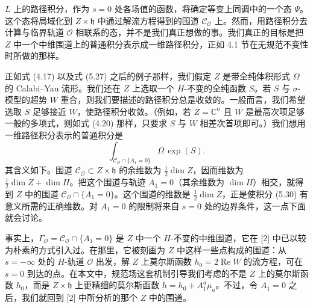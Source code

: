 \documentclass[11pt,a4paper,UTF8]{ctexart}
\theoremstyle{plain}
\theoremstyle{definition}
\begin{document}

$L$ 上的路径积分，作为 $s=0$ 处各场值的函数，将确定等变上同调中的一个态 $\Psi$。这个态将局域化到 $Z\times\mathfrak h$ 中通过解流方程得到的围道 $\mathcal C_{\mathcal O}$ 上。然而，用路径积分去计算与临界轨道 $\mathcal O$ 相联系的态，并不是我们真正想做的事。我们真正的目标是把 $Z$ 中一个中维围道上的普通积分表示成一维路径积分，正如 4.1 节在无规范不变性时所做的那样。

正如式 (4.17) 以及式 (5.27) 之后的例子那样，我们假定 $Z$ 是带全纯体积形式 $\Omega$ 的 Calabi–Yau 流形。我们还在 $Z$ 上选取一个 $H$-不变的全纯函数 $S$。若 $S$ 与 $\sigma$-模型的超势 $W$ 重合，则我们要描述的路径积分总是收敛的。一般而言，我们希望选取 $S$ 足够接近 $W$，使路径积分收敛。（例如，若 $Z=\mathbb C^n$ 且 $W$ 是最高次项足够一般的多项式，则如式 (4.20) 那样，只要求 $S$ 与 $W$ 相差次首项即可。）我们想用一维路径积分表示的普通积分是
\begin{equation}
    \int_{\mathcal C_{\mathcal O}\cap\{A_1=0\}}\Omega\,\exp(S).
    \tag{5.30}
\end{equation}
其含义如下。围道 $\mathcal C_{\mathcal O}\subset Z\times\mathfrak h$ 的余维数为 $\frac12\dim Z$，因而维数为 $\frac12\dim Z+\dim H$。把这个围道与轨迹 $A_1=0$（其余维数为 $\dim H$）相交，就得到 $Z$ 中的围道 $\mathcal C_{\mathcal O}\cap\{A_1=0\}$。这个围道的维数是 $\frac12\dim Z$，正是使积分 (5.30) 有意义所需的正确维数。对 $A_1=0$ 的限制将来自 $s=0$ 处的边界条件，这一点下面就会讨论。


事实上，$\Gamma_{\mathcal O}=\mathcal C_{\mathcal O}\cap\{A_1=0\}$ 是 $Z$ 中一个 $H$-不变的中维围道，它在 [2] 中已以较为朴素的方式引入过。在那里，它被刻画为 $Z$ 中这样一些点构成的围道：从 $s=-\infty$ 处的 $H$-轨道 $\mathcal O$ 出发，解 $Z$ 上莫尔斯函数 $h_0=2\operatorname{Re}W$ 的流方程，可在 $s=0$ 到达的点。在本文中，规范场这套机制引导我们考虑的不是 $Z$ 上的莫尔斯函数 $h_0$，而是 $Z\times\mathfrak h$ 上更精细的莫尔斯函数 $h=h_0+A_1^a\mu_a$。不过，令 $A_1=0$ 之后，我们就回到 [2] 中所分析的那个 $Z$ 中的围道。
\end{document}
